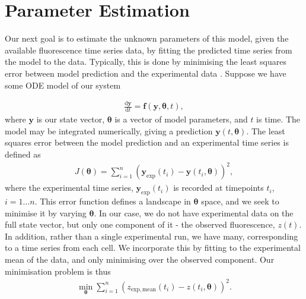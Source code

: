 \documentclass[10pt,journal]{./IEEE_latex_class/IEEEtran}
\begin{document}



\section{Parameter Estimation}
\label{Parameter Estimation}

Our next goal is to estimate the unknown parameters of this model, given the available fluorescence time series data, by fitting the predicted time series from the model to the data. Typically, this is done by minimising the least squares error between model prediction and the experimental data \cite{Brewer2008,Algorithms2003, Hu2015}. Suppose we have some ODE model of our system

\begin{align}
\frac{\mathrm{d}\mathbf{y}}{\mathrm{d}t} = \mathbf{f}(\mathbf{y},\boldsymbol{\theta},t),
\end{align}
where $\mathbf{y}$ is our state vector, $\boldsymbol{\theta}$ is a vector of model parameters, and $t$ is time. The model may be integrated numerically, giving a prediction $\mathbf{y}(t,\boldsymbol{\theta})$. The least squares error between the model prediction and an experimental time series is defined as
\begin{align}
J(\boldsymbol{\theta}) = \sum_{i =1}^{n} (\mathbf{y}_{\mathrm{exp}}(t_{i}) - \mathbf{y}(t_{i},\boldsymbol{\theta}))^2,
\end{align}
where the experimental time series, $\mathbf{y}_{\mathrm{exp}}(t_{i})$ is recorded at timepoints $t_{i}$, $i = 1 \hdots n$. This error function defines a landscape in $\boldsymbol{\theta}$ space, and we seek to minimise it by varying $\boldsymbol{\theta}$. In our case, we do not have experimental data on the full state vector, but only one component of it - the observed fluorescence, $z(t)$. In addition, rather than a single experimental run, we have many, corresponding to a time series from each cell. We incorporate this by fitting to the experimental mean of the data, and only minimising over the observed component. Our minimisation problem is thus
\begin{align}
\min_{\boldsymbol{\theta}} \sum_{i =1}^{n} (z_{\mathrm{exp, mean}}(t_{i}) - z(t_{i},\boldsymbol{\theta}))^2.
\label{eq:min}
\end{align}
\end{document}
